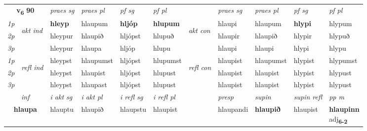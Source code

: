 \noindent
\begin{tabular}{lllllllllll} \toprule
\multicolumn{2}{c}{\textbf{v{\textsubscript{6}}} \Large{\textbf{90}}}  &  \textit{praes sg}  & \textit{praes pl}  &\textit{ pf sg} & \textit{pf pl} &  &  \textit{praes sg}  & \textit{praes pl}  & \textit{pf sg} & \textit{pf pl } \\*
	\cmidrule{3-6} \cmidrule{8-11}
 {\textit{1p}} & \multirow{3}{*}{\begin{turn}{90}\textit{akt ind}\end{turn}} & \textbf{hleyp} & hlaupum & \textbf{hljóp} & \textbf{hlupum} & \multirow{3}{*}{\begin{turn}{90}\textit{akt con}\end{turn}} &hlaupi & hlaupum & \textbf{hlypi} & hlypum\\*
 {\textit{2p}} &  &  hleypur  & hlaupið & hljópst & hlupuð & & hlaupir & hlaupið & hlypir & hlypuð \\*
{\textit{3p}} &  & hleypur & hlaupa & hljóp & hlupu & & hlaupi & hlaupi& hlypi & hlypu \\*
\cmidrule{3-6} \cmidrule{8-11}
 {\textit{1p}} & \multirow{3}{*}{\begin{turn}{90}\textit{refl ind}\end{turn}}  & hleypst & hlaupumst & hljópst & hlupumst & \multirow{3}{*}{\begin{turn}{90}\textit{refl con}\end{turn}}  &hlaupist & hlaupumst & hlypist & hlypumst \\*
 {\textit{2p}} &  & hleypst & hlaupist & hljópst & hlupust & &hlaupist & hlaupist & hlypist & hlypust \\*
 {\textit{3p}}  & & hleypst & hlaupast & hljópst & hlupust & & hlaupist & hlaupist& hlypist & hlypust \\*
\cmidrule{3-6} \cmidrule{8-11}

   \multicolumn{2}{c}{\textit{inf}}  & \textit{i akt sg} & \textit{i akt pl} & \textit{i refl sg} & \textit{i refl pl} && \textit{presp} & \textit{supin} & \textit{supin refl} & \textit{pp m} \\*
  \multicolumn{2}{c}{\textbf{hlaupa}} & hlauptu  & hlaupið & hlaupstu & hlaupist && hlaupandi &  \textbf{hlaupið} & hlaupist & \specialcell{\textbf{hlaupinn} \\ adj\textbf{\textsubscript{6-2}}} \\*
\end{tabular}

